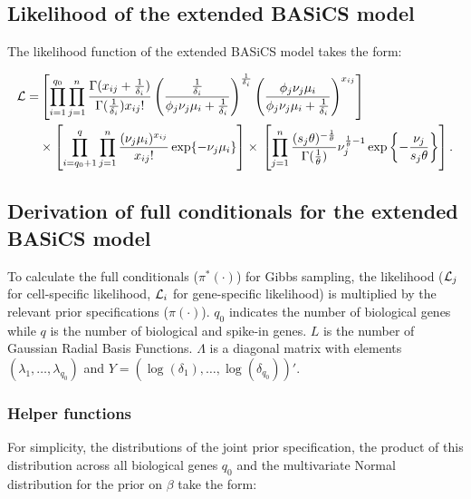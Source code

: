\subsection{Likelihood of the extended BASiCS model}

The likelihood function of the extended BASiCS model takes the form:

\begin{align} 
\mathcal{L} = & \left[\prod_{i=1}^{q_0}\prod_{j=1}^n\frac{\Gamma(x_{ij}+\frac{1}{\delta_i})}{\Gamma(\frac{1}{\delta_i})x_{ij}!}\left(\frac{\frac{1}{\delta_i}}{\phi_j\nu_j\mu_i+\frac{1}{\delta_i}}\right)^\frac{1}{\delta_i}\left(\frac{\phi_j\nu_j\mu_i}{\phi_j\nu_j\mu_i+\frac{1}{\delta_i}}\right)^{x_{ij}}\right] \nonumber\\ 
&\times\left[\prod_{i=q_0+1}^{q}\prod_{j=1}^n\frac{(\nu_j\mu_i)^{x_{ij}}}{x_{ij}!}\exp\lbrace-\nu_j\mu_i\rbrace\right]\times{}\left[\prod_{j=1}^n\frac{(s_j\theta)^{-\frac{1}{\theta}}}{\Gamma(\frac{1}{\theta})}\nu_j^{\frac{1}{\theta}-1}\exp\left\lbrace-\frac{\nu_j}{s_j\theta}\right\rbrace\right].
\end{align} 

\subsection{Derivation of full conditionals for the extended BASiCS model}
\label{appB.1.derivation}

To calculate the full conditionals ($\pi^*(\cdot)$) for Gibbs sampling, the likelihood ($\mathcal{L}_j$ for cell-specific likelihood, $\mathcal{L}_i$ for gene-specific likelihood) is multiplied by the relevant prior specifications ($\pi(\cdot)$). $q_0$ indicates the number of biological genes while $q$ is the number of biological and spike-in genes. $L$ is the number of Gaussian Radial Basis Functions. $\Lambda$ is a diagonal matrix with elements $(\lambda_1, \ldots, \lambda_{q_0})$ and $Y = (\log(\delta_1), \ldots, \log(\delta_{q_0}))'$.

\newpage 

\subsubsection{Helper functions}

For simplicity, the distributions of the joint prior specification, the product of this distribution across all biological genes $q_0$ and the multivariate Normal distribution for the prior on $\beta$ take the form:

